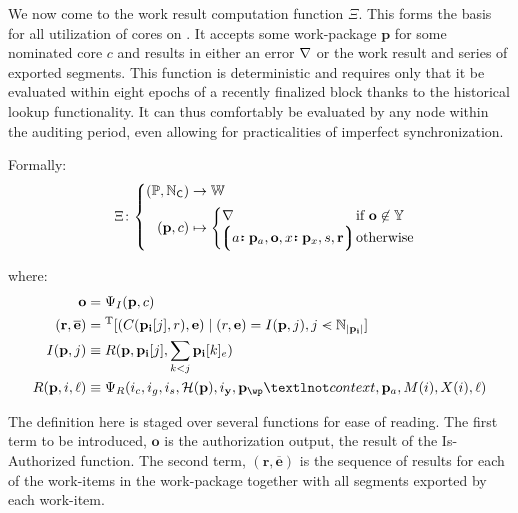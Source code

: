 We now come to the work result computation function $\Xi$. This forms the basis for all utilization of cores on \Jam. It accepts some work-package $\mathbf{p}$ for some nominated core $c$ and results in either an error $\nabla$ or the work result and series of exported segments. This function is deterministic and requires only that it be evaluated within eight epochs of a recently finalized block thanks to the historical lookup functionality. It can thus comfortably be evaluated by any node within the auditing period, even allowing for practicalities of imperfect synchronization.

Formally:
\begin{equation}\label{eq:workresultfunction}
  \!\!\Xi \colon \left\{\begin{aligned}
    (\mathbb{P}, \N_\mathsf{C}) &\to \mathbb{W} \\
    (\mathbf{p}, c) &\mapsto \begin{cases}
        \error &\when \mathbf{o} \not\in \Y \\
        \tup{\is{a}{\mathbf{p}_a}, \mathbf{o}, \is{x}{\mathbf{p}_x}, s, \mathbf{r}} \!\!\!\!\!&\otherwise
    \end{cases}
  \end{aligned}\right.\!\!\!\!\!\!\!
\end{equation}

where:
\begin{align*}
  \mathbf{o} &= \Psi_I(\mathbf{p}, c) \\
  (\mathbf{r}, \overline{\mathbf{e}}) &= \transpose[(\itemtoresult(\mathbf{p}_\mathbf{i}[j], r), \mathbf{e}) \mid (r, \mathbf{e}) = \countupexports(\mathbf{p}, j), j \orderedin \N_{|\mathbf{p}_\mathbf{i}|}] \\
  \countupexports(\mathbf{p}, j) &\equiv \marshallrefine(\mathbf{p}, \mathbf{p}_\mathbf{i}[j], \sum_{k < j}\mathbf{p}_\mathbf{i}[k]_e)\\
  \marshallrefine(\mathbf{p}, i, \ell) &\equiv \Psi_R(i_c, i_g, i_s, \mathcal{H}(\mathbf{p}), i_\mathbf{y}, \mathbf{p}_\wp¬context, \mathbf{p}_a, \importsegmentdata(i), \extrinsicdata(i), \ell)
\end{align*}

The definition here is staged over several functions for ease of reading. The first term to be introduced, $\mathbf{o}$ is the authorization output, the result of the Is-Authorized function. The second term, $(\mathbf{r}, \overline{\mathbf{e}})$ is the sequence of results for each of the work-items in the work-package together with all segments exported by each work-item.

